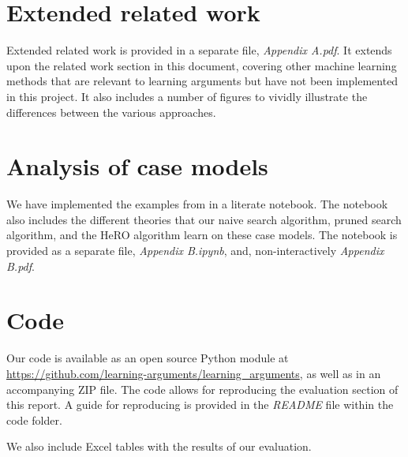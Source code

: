 \documentclass{report}
\begin{document}
\begin{appendices}
\label{appendix-related-work}
\chapter{Extended related work}
Extended related work is provided in a separate file, \textit{Appendix A.pdf}. It extends upon the related work section in this document, covering other machine learning methods that are relevant to learning arguments but have not been implemented in this project. It also includes a number of figures to vividly illustrate the differences between the various approaches.

\label{appendix-notebook}
\chapter{Analysis of case models}
We have implemented the examples from \cite{verheijProofProbabilities2017} in a literate notebook. The notebook also includes the different theories that our naive search algorithm, pruned search algorithm, and the HeRO algorithm learn on these case models. The notebook is provided as a separate file, \textit{Appendix B.ipynb}, and, non-interactively \textit{Appendix B.pdf}.

\label{appendix-code}
\chapter{Code}
Our code is available as an open source Python module at \url{https://github.com/learning-arguments/learning_arguments}, as well as in an accompanying ZIP file. The code allows for reproducing the evaluation section of this report. A guide for reproducing is provided in the \textit{README} file within the code folder.

We also include Excel tables with the results of our evaluation.

\end{appendices}



\end{document}
